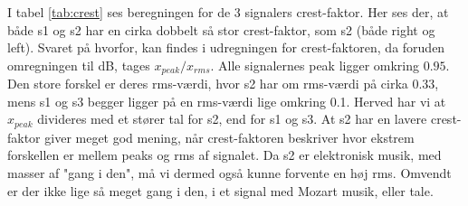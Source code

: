 \documentclass[../main.tex]{subfiles}
\begin{document}
I tabel \ref{tab:crest} ses beregningen for de 3 signalers crest-faktor. Her ses der, at både s1 og s2 har en cirka dobbelt så stor crest-faktor, som s2 (både right og left). Svaret på hvorfor, kan findes i udregningen for crest-faktoren, da foruden omregningen til dB, tages \( x_{peak}/x_{rms} \). Alle signalernes peak ligger omkring \(0.95\). Den store forskel er deres rms-værdi, hvor s2 har om rms-værdi på cirka 0.33, mens s1 og s3 begger ligger på en rms-værdi lige omkring 0.1. Herved har vi at \(x_{peak}\) divideres med et stører tal for s2, end for s1 og s3. At s2 har en lavere crest-faktor giver meget god mening, når crest-faktoren beskriver hvor ekstrem forskellen er mellem peaks og rms af signalet. Da s2 er elektronisk musik, med masser af "gang i den", må vi dermed også kunne forvente en høj rms. Omvendt er der ikke lige så meget gang i den, i et signal med Mozart musik, eller tale.
\end{document}
